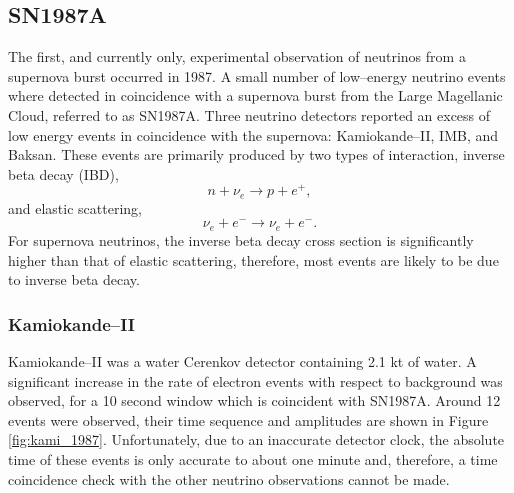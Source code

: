 \subsection{SN1987A}

The first, and currently only, experimental observation of neutrinos from a 
supernova burst occurred in 1987. A small number of low--energy neutrino 
events where detected in coincidence with a supernova burst from the Large 
Magellanic Cloud, referred to as SN1987A. Three neutrino detectors reported an 
excess of low energy events in coincidence with the supernova: Kamiokande--II, 
IMB, and Baksan. These events are primarily produced by two types of 
interaction, inverse beta decay (IBD),
\begin{equation*}
	n + \nu_e \rightarrow p + e^+,
\end{equation*}
and elastic scattering,
\begin{equation*}
	\nu_e + e^- \rightarrow \nu_e + e^-.
\end{equation*}
For supernova neutrinos, the inverse beta decay cross section is significantly 
higher than that of elastic scattering, therefore, most events are likely to be
due to inverse beta decay.

\subsubsection{Kamiokande--II}
Kamiokande--II was a water Cerenkov detector containing 2.1 kt of water. A
significant increase in the rate of electron events with respect to background
was observed, for a 10 second window which is coincident with 
SN1987A\cite{Hirata:1987hu}. Around 12 events were observed, their time sequence
and amplitudes are shown in Figure \ref{fig:kami_1987}. Unfortunately, due to 
an inaccurate detector clock, the absolute time of these events is only 
accurate to about one minute and, therefore, a time coincidence check with the 
other neutrino observations cannot be made.

